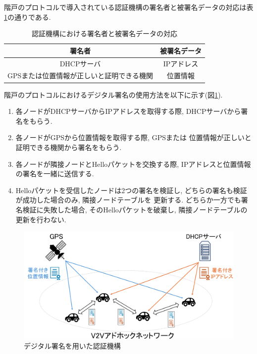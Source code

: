 \indent 階戸のプロトコルで導入されている認証機構の署名者と被署名データの対応は表\ref{tab:auth}の通りである.
\setlength{\tabcolsep}{30pt}
\begin{longtable}{cc}
  \caption{認証機構における署名者と被署名データの対応}\label{tab:auth}\\
  \endfirsthead
  \hline
  \multicolumn{1}{c}{署名者} & \multicolumn{1}{c}{被署名データ} \\ \hline \hline
  DHCPサーバ & IPアドレス \\
  GPSまたは位置情報が正しいと証明できる機関 & 位置情報 \\ \hline
\end{longtable}
\vspace{2em}
\indent 階戸のプロトコルにおけるデジタル署名の使用方法を以下に示す(図\ref{fig:introduce}).
\begin{enumerate}
  \item 各ノードがDHCPサーバからIPアドレスを取得する際, 
  DHCPサーバから署名をもらう.
  \item 各ノードがGPSから位置情報を取得する際, GPSまたは
  位置情報が正しいと証明できる機関から署名をもらう.
  \item 各ノードが隣接ノードとHelloパケットを交換する際, 
  IPアドレスと位置情報の署名を一緒に送信する. 
  \item Helloパケットを受信したノードは2つの署名を検証し, 
  どちらの署名も検証が成功した場合のみ, 隣接ノードテーブルを
  更新する. どちらか一方でも署名検証に失敗した場合, 
  そのHelloパケットを破棄し, 隣接ノードテーブルの更新を行わない.
\end{enumerate}

\begin{figure}[h]
  \centering
  \includegraphics[scale=0.6]{figures/introduce.png}
  \caption{デジタル署名を用いた認証機構\cite{shinato}}
  \label{fig:introduce}
\end{figure}
